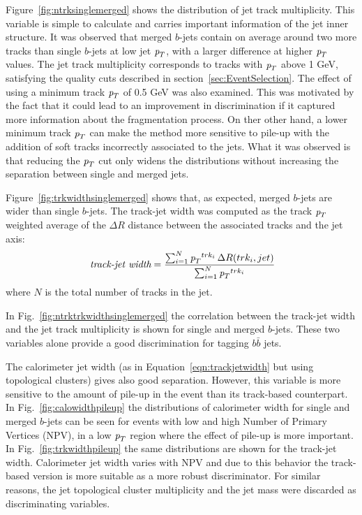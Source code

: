 Figure~\ref{fig:ntrksinglemerged} shows the distribution of jet track multiplicity. This variable is simple to calculate and carries important information of the jet inner structure. It was observed that merged $b$-jets contain on average around two more tracks than single $b$-jets at low jet ${\emph{p}_{T}}$, with a larger difference at higher ${\emph{p}_{T}}$ values. The jet track multiplicity corresponds to tracks with ${\emph{p}_{T}}$ above 1 GeV, satisfying the quality cuts described in section~\ref{sec:EventSelection}. The effect of using a minimum track ${\emph{p}_{T}}$ of 0.5 GeV was also examined. This was motivated by the fact that it could lead to an improvement in discrimination if it captured more information about the fragmentation process.  On ther other hand, a lower minimum track ${\emph{p}_{T}}$ can make the method more sensitive to pile-up with the addition of soft tracks incorrectly associated to the jets.  What it was observed is that reducing the ${\emph{p}_{T}}$ cut only widens the distributions without increasing the separation between single and merged jets. 

Figure~\ref{fig:trkwidthsinglemerged} shows that, as expected, merged $b$-jets are wider than single $b$-jets. The track-jet width was computed as the track ${\emph{p}_{T}}$ weighted average of the $\Delta R$ distance between the associated tracks and the jet axis:
\begin{equation} 
\mbox{ {\it track-jet width}} = \frac{\sum_{i=1}^N {\emph{p}_{T}}^{trk_i} \,\Delta R (trk_i,jet) }{\sum_{i=1}^N {\emph{p}_{T}}^{trk_i} }
\label{eqn:trackjetwidth}
\end{equation} 
where $N$ is the total number of tracks in the jet.


In Fig.~\ref{fig:ntrktrkwidthsinglemerged} the correlation between the track-jet width and the jet track multiplicity is shown for single and merged $b$-jets. These two variables alone provide a good discrimination for tagging $b \bar{b}$ jets.


The calorimeter jet width (as in Equation~\ref{eqn:trackjetwidth} but using topological clusters) gives also good separation. However, this variable is more sensitive to the amount of pile-up in the event than its track-based counterpart. In Fig.~\ref{fig:calowidthpileup} the distributions of calorimeter width for single and merged $b$-jets  can be seen for events with low and high Number of Primary Vertices (NPV), in a low ${\emph{p}_{T}}$ region where the effect of pile-up is more important. In Fig.~\ref{fig:trkwidthpileup} the same distributions are shown for the track-jet width. Calorimeter jet width varies %
with NPV and due to this behavior the track-based version is more suitable as a more robust discriminator. For similar reasons, the jet topological cluster multiplicity and the jet mass were discarded as discriminating variables.


